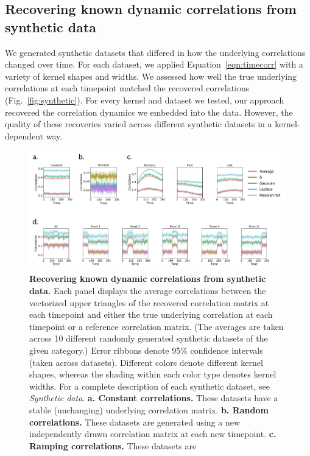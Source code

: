 \documentclass[english]{article}
\begin{document}
\subsection*{Recovering known dynamic correlations from synthetic data}
We generated synthetic datasets that differed in how the underlying
correlations changed over time.  For each dataset, we applied
Equation~\ref{eqn:timecorr} with a variety of kernel shapes and
widths.  We assessed how well the true underlying correlations at each
timepoint matched the recovered correlations
(Fig.~\ref{fig:synthetic}).  For every kernel and dataset we tested,
our approach recovered the correlation dynamics we embedded into the
data.  However, the quality of these recoveries varied across
different synthetic datasets in a kernel-dependent way.


\begin{figure}[tp]
  \centering
  \includegraphics[width=\textwidth]{figs/synthetic_data}
  \caption{\textbf{Recovering known dynamic correlations from
      synthetic data.}  Each panel displays the average correlations
    between the vectorized upper triangles of the recovered
    correlation matrix at each timepoint and either the true
    underlying correlation at each timepoint or a reference
    correlation matrix.  (The averages are taken across 10 different
    randomly generated synthetic datasets of the given category.)
    Error ribbons denote 95\% confidence intervals (taken across
    datasets). Different colors denote different kernel shapes,
    whereas the shading within each color type denotes kernel widths.
    For a complete description of each synthetic dataset, see
    \textit{Synthetic data}.  \textbf{a. Constant correlations.} These
    datasets have a stable (unchanging) underlying correlation matrix.
    \textbf{b. Random correlations.}  These datasets are generated
    using a new independently drawn correlation matrix at each new
    timepoint.  \textbf{c. Ramping correlations.}  These datasets are
}
\end{figure}
\end{document}
